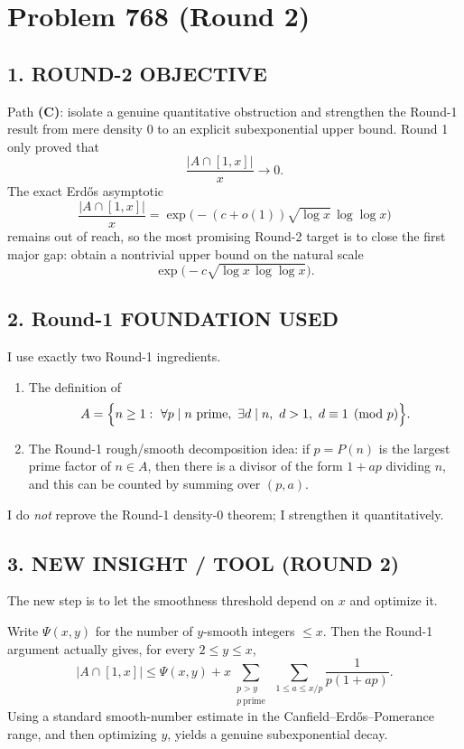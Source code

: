 
\section*{Problem 768 (Round 2)}

\subsection*{1. ROUND-2 OBJECTIVE}

Path \textbf{(C)}: isolate a genuine quantitative obstruction and strengthen the Round-1 result from mere density $0$ to an explicit subexponential upper bound.
Round 1 only proved that
\[
\frac{|A\cap[1,x]|}{x}\to 0.
\]
The exact Erd\H{o}s asymptotic
\[
\frac{|A\cap[1,x]|}{x}=\exp\!\bigl(-(c+o(1))\sqrt{\log x}\,\log\log x\bigr)
\]
remains out of reach, so the most promising Round-2 target is to close the first major gap: obtain a nontrivial upper bound on the natural scale
\[
\exp\!\bigl(-c\sqrt{\log x\,\log\log x}\bigr).
\]

\subsection*{2. Round-1 FOUNDATION USED}

I use exactly two Round-1 ingredients.

\begin{enumerate}
\item The definition of
\[
A=\Bigl\{n\ge 1:\ \forall p\mid n \text{ prime},\ \exists d\mid n,\ d>1,\ d\equiv 1 \pmod p\Bigr\}.
\]
\item The Round-1 rough/smooth decomposition idea: if $p=P(n)$ is the largest prime factor of $n\in A$, then there is a divisor of the form $1+ap$ dividing $n$, and this can be counted by summing over $(p,a)$.
\end{enumerate}

I do \emph{not} reprove the Round-1 density-$0$ theorem; I strengthen it quantitatively.

\subsection*{3. NEW INSIGHT / TOOL (ROUND 2)}

The new step is to let the smoothness threshold depend on $x$ and optimize it.

Write $\Psi(x,y)$ for the number of $y$-smooth integers $\le x$.
Then the Round-1 argument actually gives, for every $2\le y\le x$,
\[
|A\cap[1,x]|
\le
\Psi(x,y)
+
x\sum_{\substack{p>y\\ p\ \mathrm{prime}}}\ \sum_{1\le a\le x/p}\frac{1}{p(1+ap)}.
\]
Using a standard smooth-number estimate in the Canfield--Erd\H{o}s--Pomerance range, and then optimizing $y$, yields a genuine subexponential decay.

